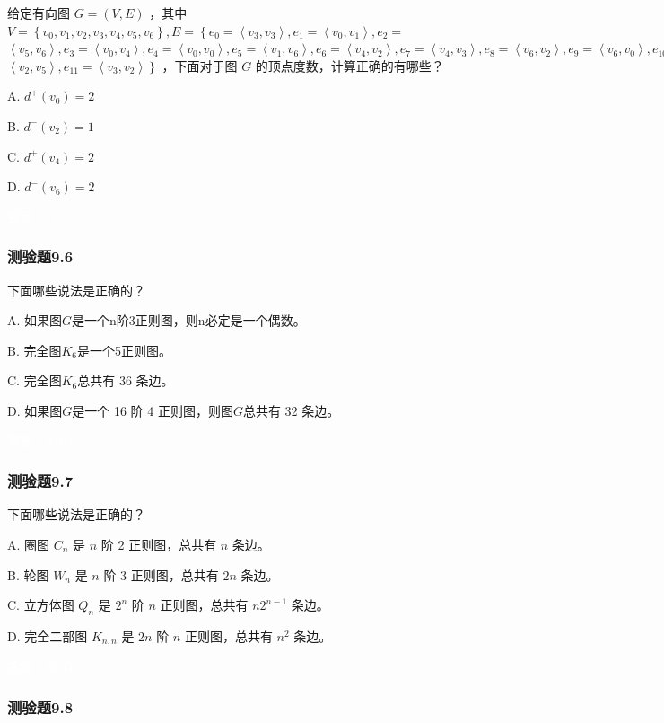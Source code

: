 \documentclass[UTF8, heading=true]{ctexart}
\begin{document}
给定有向图 $G=(V, E)$ ，其中 $V=\left\{v_0, v_1, v_2, v_3, v_4, v_5, v_6\right\}, E=\left\{e_0=\left\langle v_3, v_3\right\rangle, e_1=\left\langle v_0, v_1\right\rangle, e_2=\right.$ $\left\langle v_5, v_6\right\rangle, e_3=\left\langle v_0, v_4\right\rangle, e_4=\left\langle v_0, v_0\right\rangle, e_5=\left\langle v_1, v_6\right\rangle, e_6=\left\langle v_4, v_2\right\rangle, e_7=\left\langle v_4, v_3\right\rangle, e_8=\left\langle v_6, v_2\right\rangle, e_9=\left\langle v_6, v_0\right\rangle, e_{10}=$ $\left.\left\langle v_2, v_5\right\rangle, e_{11}=\left\langle v_3, v_2\right\rangle\right\}$ ，下面对于图 $G$ 的顶点度数，计算正确的有哪些？

A. $d^{+}\left(v_0\right)=2$

B. $d^{-}\left(v_2\right)=1$

C. $d^{+}\left(v_4\right)=2$

D. $d^{-}\left(v_6\right)=2$

\textcolor{white}{答案：CD}

\subsubsection{测验题9.6}

下面哪些说法是正确的？

A. 如果图$G$是一个n阶3正则图，则n必定是一个偶数。

B. 完全图$K_6$是一个5正则图。

C. 完全图$K_6$总共有 36 条边。

D. 如果图$G$是一个 16 阶 4 正则图，则图$G$总共有 32 条边。

\textcolor{white}{答案：ABD}

\subsubsection{测验题9.7}

下面哪些说法是正确的？

A. 圈图 $C_n$ 是 $n$ 阶 2 正则图，总共有 $n$ 条边。

B. 轮图 $W_n$ 是 $n$ 阶 3 正则图，总共有 $2 n$ 条边。

C. 立方体图 $Q_n$ 是 $2^n$ 阶 $n$ 正则图，总共有 $n 2^{n-1}$ 条边。

D. 完全二部图 $K_{n, n}$ 是 $2 n$ 阶 $n$ 正则图，总共有 $n^2$ 条边。

\textcolor{white}{答案：ACD}

\subsubsection{测验题9.8}
\end{document}
